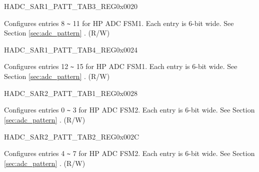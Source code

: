 \begin{register}{H}{ADC\_SAR1\_PATT\_TAB3\_REG}{0x0020}\label{regdesc:ADCSAR1PATTTAB3REG}
%
%
\regnewline%
\begin{regdesc}\begin{reglist}
\label{fielddesc:ADCSAR1PATTTAB3}\item [ADC\_SAR1\_PATT\_TAB3] Configures entries 8 \verb+~+ 11 for HP ADC FSM1. Each entry is 6-bit wide. See Section \ref{sec:adc_pattern} \textit{}. (R/W)
\end{reglist}\end{regdesc}
\end{register}


\begin{register}{H}{ADC\_SAR1\_PATT\_TAB4\_REG}{0x0024}\label{regdesc:ADCSAR1PATTTAB4REG}
%
%
\regnewline%
\begin{regdesc}\begin{reglist}
\label{fielddesc:ADCSAR1PATTTAB4}\item [ADC\_SAR1\_PATT\_TAB4] Configures entries 12 \verb+~+ 15 for HP ADC FSM1. Each entry is 6-bit wide. See Section \ref{sec:adc_pattern} \textit{}. (R/W)
\end{reglist}\end{regdesc}
\end{register}


\begin{register}{H}{ADC\_SAR2\_PATT\_TAB1\_REG}{0x0028}\label{regdesc:ADCSAR2PATTTAB1REG}
%
%
\regnewline%
\begin{regdesc}\begin{reglist}
\label{fielddesc:ADCSAR2PATTTAB1}\item [ADC\_SAR2\_PATT\_TAB1] Configures entries 0 \verb+~+ 3 for HP ADC FSM2. Each entry is 6-bit wide. See Section \ref{sec:adc_pattern} \textit{}. (R/W)
\end{reglist}\end{regdesc}
\end{register}


\begin{register}{H}{ADC\_SAR2\_PATT\_TAB2\_REG}{0x002C}\label{regdesc:ADCSAR2PATTTAB2REG}
%
%
\regnewline%
\begin{regdesc}\begin{reglist}
\label{fielddesc:ADCSAR2PATTTAB2}\item [ADC\_SAR2\_PATT\_TAB2] Configures entries 4 \verb+~+ 7 for HP ADC FSM2. Each entry is 6-bit wide. See Section \ref{sec:adc_pattern} \textit{}. (R/W)
\end{reglist}\end{regdesc}
\end{register}


